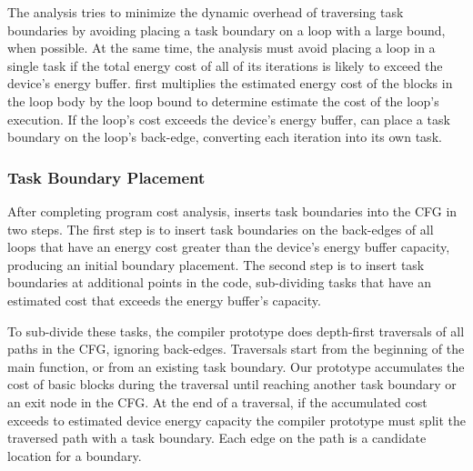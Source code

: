 
The analysis tries to minimize the dynamic overhead of traversing task
boundaries by avoiding placing a task boundary on a loop with a large bound,
when possible. At the same time, the analysis must avoid placing a loop in a
single task if the total energy cost of all of its iterations is likely to
exceed the device's energy buffer. \sys first multiplies the estimated energy
cost of the blocks in the loop body by the loop bound to determine estimate the
cost of the loop's execution. If the loop's cost exceeds the device's energy
buffer, \sys can place a task boundary on the loop's back-edge, converting each
iteration into its own task.  



\subsubsection{Task Boundary Placement}
\label{sec:compiler_boundary}

After completing program cost analysis, \sys inserts task boundaries into the CFG in two steps. The first step is to insert task boundaries on the back-edges of all loops that have an energy cost greater than the device's energy buffer capacity, producing an initial boundary placement. The second step is to insert task boundaries at additional points in the code, sub-dividing tasks that have an estimated cost that exceeds the energy buffer's capacity.

To sub-divide these tasks, the compiler prototype does depth-first traversals of all paths in the CFG, ignoring back-edges. Traversals start from the beginning of the main function, or from an existing task boundary. Our prototype accumulates the cost of basic blocks during the traversal until reaching another task boundary or an exit node in the CFG. At the end of a traversal, if the accumulated cost exceeds to estimated device energy capacity the compiler prototype must split the traversed path with a task boundary. Each edge on the path is a candidate location for a boundary.

